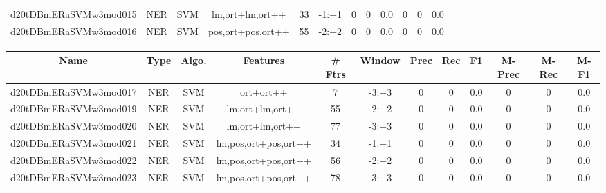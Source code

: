 \documentclass[a4paper]{article}
\begin{document}
\begin{landscape}
\begin{center}
\begin{tabular}{ |c|c|c|c|c|c|c|c|c|c|c|c|}
 
 	
 	\small{ d20tDBmERaSVMw3mod015 } & \small{ NER} & \small{  SVM }  & lm,ort+lm,ort++  &  33 &  \small{  -1:+1 }  &  0 & 0 & 0.0  &  0 & 0 & 0.0 \\
 	

 
 	
 	\small{ d20tDBmERaSVMw3mod016 } & \small{ NER} & \small{  SVM }  & pos,ort+pos,ort++  &  55 &  \small{  -2:+2 }  &  0 & 0 & 0.0  &  0 & 0 & 0.0 \\
 	
 \hline
\end{tabular}
\end{center}




\begin{center}
\begin{tabular}{ |c|c|c|c|c|c|c|c|c|c|c|c|} 
 \hline
 	Name & Type & Algo. & Features & \# Ftrs & Window & Prec & Rec & F1 & M-Prec & M-Rec & M-F1\\
 \hline

 	

 
 	
 	\small{ d20tDBmERaSVMw3mod017 } & \small{ NER} & \small{  SVM }  & ort+ort++  &  7 &  \small{  -3:+3 }  &  0 & 0 & 0.0  &  0 & 0 & 0.0 \\
 	

 
 	
 	\small{ d20tDBmERaSVMw3mod019 } & \small{ NER} & \small{  SVM }  & lm,ort+lm,ort++  &  55 &  \small{  -2:+2 }  &  0 & 0 & 0.0  &  0 & 0 & 0.0 \\
 	

 
 	
 	\small{ d20tDBmERaSVMw3mod020 } & \small{ NER} & \small{  SVM }  & lm,ort+lm,ort++  &  77 &  \small{  -3:+3 }  &  0 & 0 & 0.0  &  0 & 0 & 0.0 \\
 	

 
 	
 	\small{ d20tDBmERaSVMw3mod021 } & \small{ NER} & \small{  SVM }  & lm,pos,ort+pos,ort++  &  34 &  \small{  -1:+1 }  &  0 & 0 & 0.0  &  0 & 0 & 0.0 \\
 	

 
 	
 	\small{ d20tDBmERaSVMw3mod022 } & \small{ NER} & \small{  SVM }  & lm,pos,ort+pos,ort++  &  56 &  \small{  -2:+2 }  &  0 & 0 & 0.0  &  0 & 0 & 0.0 \\
 	

 
 	
 	\small{ d20tDBmERaSVMw3mod023 } & \small{ NER} & \small{  SVM }  & lm,pos,ort+pos,ort++  &  78 &  \small{  -3:+3 }  &  0 & 0 & 0.0  &  0 & 0 & 0.0 \\
 	


\end{tabular}
\end{center}
\end{landscape}
\end{document}
